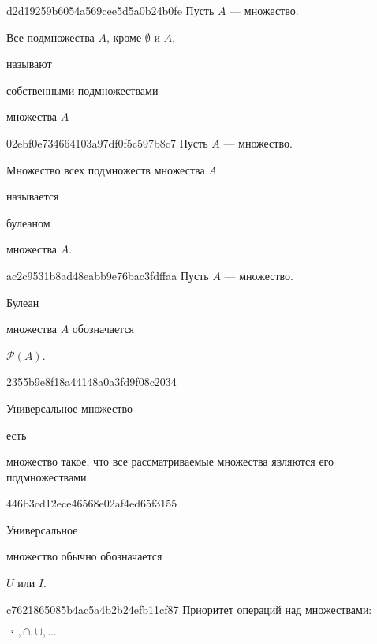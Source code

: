 \begin{note}{d2d19259b6054a569cee5d5a0b24b0fe}
    Пусть \({ A }\) --- множество.
    \begin{icloze}{1}Все подмножества \({ A }\), кроме \({ \emptyset }\) и \({ A }\),\end{icloze} называют \begin{icloze}{2}собственными подмножествами\end{icloze} множества \({ A }\)
\end{note}

\begin{note}{02ebf0e734664103a97df0f5c597b8c7}
    Пусть \({ A }\) --- множество.
    \begin{icloze}{2}Множество всех подмножеств множества \({ A }\)\end{icloze} называется \begin{icloze}{1}булеаном\end{icloze} множества \({ A }\).
\end{note}

\begin{note}{ac2c9531b8ad48eabb9e76bac3fdffaa}
    Пусть \({ A }\) --- множество.
    \begin{icloze}{2}Булеан\end{icloze} множества \({ A }\) обозначается \begin{icloze}{1}\({ \mathcal P(A) }\).\end{icloze}
\end{note}

\begin{note}{2355b9e8f18a44148a0a3fd9f08c2034}
    \begin{icloze}{2}Универсальное множество\end{icloze} есть \begin{icloze}{1}множество такое, что все рассматриваемые множества являются его подмножествами.\end{icloze}
\end{note}

\begin{note}{446b3cd12ece46568e02af4ed65f3155}
    \begin{icloze}{2}Универсальное\end{icloze} множество обычно обозначается \begin{icloze}{1}\({ U }\) или \({ I }\).\end{icloze}
\end{note}

\begin{note}{c7621865085b4ac5a4b2b24efb11cf87}
    Приоритет операций над множествами: \begin{icloze}{1}\({ \overline{\ \cdot\ }, \cap, \cup, \ldots }\)\end{icloze}
\end{note}

